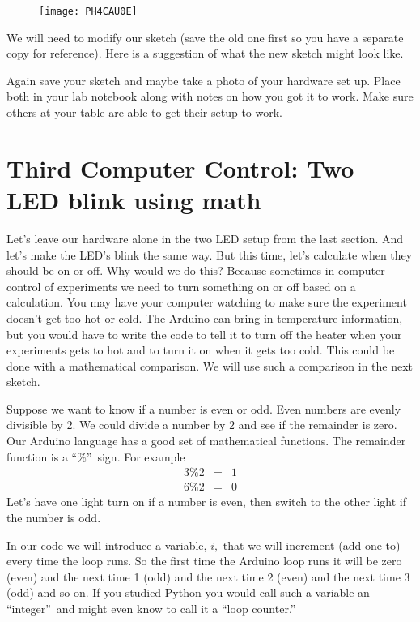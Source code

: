 \begin{figure}[h!]
\texttt{[image: PH4CAU0E]}
\end{figure}We will need to modify our sketch
(save the old one first so you have a separate copy for reference). Here is
a suggestion of what the new sketch might look like.




Again save your sketch and maybe take a photo of your hardware set up. Place
both in your lab notebook along with notes on how you got it to work. Make
sure others at your table are able to get their setup to work.

\section{Third Computer Control: Two LED blink using math}

Let's leave our hardware alone in the two LED setup from the last section.
And let's make the LED's blink the same way. But this time, let's calculate
when they should be on or off. Why would we do this? Because sometimes in
computer control of experiments we need to turn something on or off based on
a calculation. You may have your computer watching to make sure the
experiment doesn't get too hot or cold. The Arduino can bring in temperature
information, but you would have to write the code to tell it to turn off the
heater when your experiments gets to hot and to turn it on when it gets too
cold. This could be done with a mathematical comparison. We will use such a
comparison in the next sketch.

Suppose we want to know if a number is even or odd. Even numbers are evenly
divisible by $2.$ We could divide a number by $2$ and see if the remainder
is zero. Our Arduino language has a good set of mathematical functions. The
remainder function is a \textquotedblleft \%\textquotedblright\ sign. For
example 
\begin{eqnarray*}
3\%2 &=&1 \\
6\%2 &=&0
\end{eqnarray*}%
Let's have one light turn on if a number is even, then switch to the other
light if the number is odd.

In our code we will introduce a variable, $i,$ that we will increment (add
one to) every time the loop runs. So the first time the Arduino loop runs it
will be zero (even) and the next time 1 (odd) and the next time 2 (even) and
the next time 3 (odd) and so on. If you studied Python you would call such a
variable an \textquotedblleft integer\textquotedblright\ and might even know
to call it a \textquotedblleft loop counter.\textquotedblright

